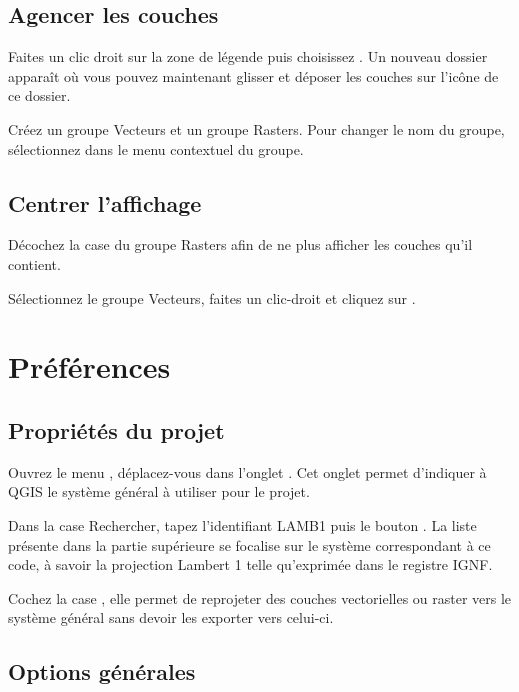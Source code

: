 \subsection{Agencer les couches}

Faites un clic droit sur la zone de légende puis choisissez . Un nouveau dossier apparaît où vous pouvez maintenant glisser et déposer les couches sur l'icône de ce dossier. 

Créez un groupe Vecteurs et un groupe Rasters. Pour changer le nom du groupe, sélectionnez  dans le menu contextuel du groupe.

\subsection{Centrer l'affichage}

Décochez la case du groupe Rasters afin de ne plus afficher les couches qu'il contient.

Sélectionnez le groupe Vecteurs, faites un clic-droit et cliquez sur .

\section{Préférences}\label{sec:} 

\subsection{Propriétés du projet}

Ouvrez le menu \arrow {}, déplacez-vous dans l'onglet . Cet onglet permet d'indiquer à QGIS le système général à utiliser pour le projet.

Dans la case Rechercher, tapez l'identifiant LAMB1 puis le bouton . La liste présente dans la partie supérieure se focalise sur le système correspondant à ce code, à savoir la projection Lambert 1 telle qu'exprimée dans le registre IGNF.

Cochez la case , elle permet de reprojeter des couches vectorielles ou raster vers le système général sans devoir les exporter vers celui-ci.

\subsection{Options générales}

